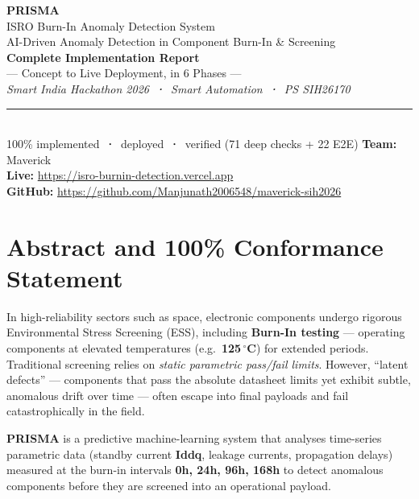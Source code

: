 \documentclass[11pt,a4paper]{article}
\newcommand{\keys}[1]{\textbf{\sffamily#1}}
\begin{document}
\begin{titlepage}
  \centering
  \vspace*{1.5cm}
  {\Huge\bfseries\color{isroblue} PRISMA}\\[0.5cm]
  {\LARGE ISRO Burn-In Anomaly Detection System}\\[0.3cm]
  {\large AI-Driven Anomaly Detection in Component Burn-In \& Screening}\\[1.5cm]
  {\large\bfseries Complete Implementation Report}\\[0.3cm]
  {\large --- Concept to Live Deployment, in 6 Phases ---}\\[1.5cm]
  {\itshape\large Smart India Hackathon 2026 \,\textbf{·}\, Smart Automation \,\textbf{·}\, PS SIH26170}\\[0.8cm]
  {\color{isroorange}\rule{0.6\textwidth}{1pt}}\\[1cm]
  {\normalsize 100\% implemented \,\textbf{·}\, deployed \,\textbf{·}\, verified (71 deep checks + 22 E2E)}
  \vfill
  {\normalsize\textbf{Team:} Maverick}\\[0.2cm]
  {\normalsize\textbf{Live:} \url{https://isro-burnin-detection.vercel.app}}\\[0.2cm]
  {\normalsize\textbf{GitHub:} \url{https://github.com/Manjunath2006548/maverick-sih2026}}
\end{titlepage}

\section{Abstract and 100\% Conformance Statement}

\noindent In high-reliability sectors such as space, electronic components undergo rigorous
Environmental Stress Screening (ESS), including \textbf{Burn-In testing} --- operating components at
elevated temperatures (e.g.\ \textbf{125\,$^{\circ}$C}) for extended periods. Traditional screening
relies on \emph{static parametric pass/fail limits}. However, ``latent defects'' --- components that
pass the absolute datasheet limits yet exhibit subtle, anomalous drift over time --- often escape
into final payloads and fail catastrophically in the field.

\noindent \textbf{PRISMA} is a predictive machine-learning system that analyses time-series
parametric data (standby current \keys{Iddq}, leakage currents, propagation delays) measured at
the burn-in intervals \keys{0h, 24h, 96h, 168h} to detect anomalous components before they are
screened into an operational payload.
\end{document}

